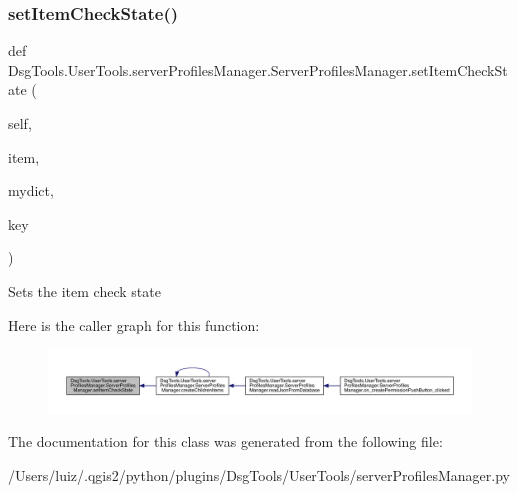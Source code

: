 \subsubsection{\texorpdfstring{set\+Item\+Check\+State()}{setItemCheckState()}}
{\footnotesize\ttfamily def Dsg\+Tools.\+User\+Tools.\+server\+Profiles\+Manager.\+Server\+Profiles\+Manager.\+set\+Item\+Check\+State (\begin{DoxyParamCaption}\item[{}]{self,  }\item[{}]{item,  }\item[{}]{mydict,  }\item[{}]{key }\end{DoxyParamCaption})}

\begin{DoxyVerb}Sets the item check state
\end{DoxyVerb}
 Here is the caller graph for this function\+:
\nopagebreak
\begin{figure}[H]
\begin{center}
\leavevmode
\includegraphics[width=350pt]{class_dsg_tools_1_1_user_tools_1_1server_profiles_manager_1_1_server_profiles_manager_a9f7d36e48d6eb2493d1e091cd9656658_icgraph}
\end{center}
\end{figure}


The documentation for this class was generated from the following file\+:\begin{DoxyCompactItemize}
\item 
/\+Users/luiz/.\+qgis2/python/plugins/\+Dsg\+Tools/\+User\+Tools/server\+Profiles\+Manager.\+py\end{DoxyCompactItemize}
